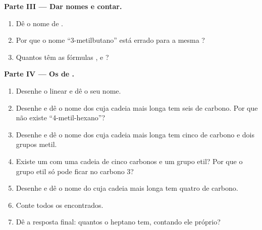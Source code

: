 \begin{problem}
\medskip
\noindent\textbf{Parte III --- Dar nomes e contar.}
\begin{enumerate}[resume]
  \item Dê o nome de .
  \item Por que o nome ``3-metilbutano'' está errado para a mesma
        ?
  \item Quantos   têm as fórmulas ,
         e ?
\end{enumerate}

\medskip
\noindent\textbf{Parte IV --- Os  de .}
\begin{enumerate}[resume]
  \item Desenhe o  linear e dê o seu nome.
  \item Desenhe e dê o nome dos  cuja cadeia mais longa tem seis
         de carbono. Por que não existe ``4-metil-hexano''?
  \item Desenhe e dê o nome dos  cuja cadeia mais longa tem cinco
         de carbono e dois grupos metil.
  \item Existe um  com uma cadeia de cinco carbonos e um grupo
        etil? Por que o grupo etil só pode ficar no carbono 3?
  \item Desenhe e dê o nome do  cuja cadeia mais longa tem quatro
         de carbono.
  \item Conte todos os  encontrados.
  \item Dê a resposta final: quantos  o heptano
        tem, contando ele próprio?
\end{enumerate}
\end{problem}
